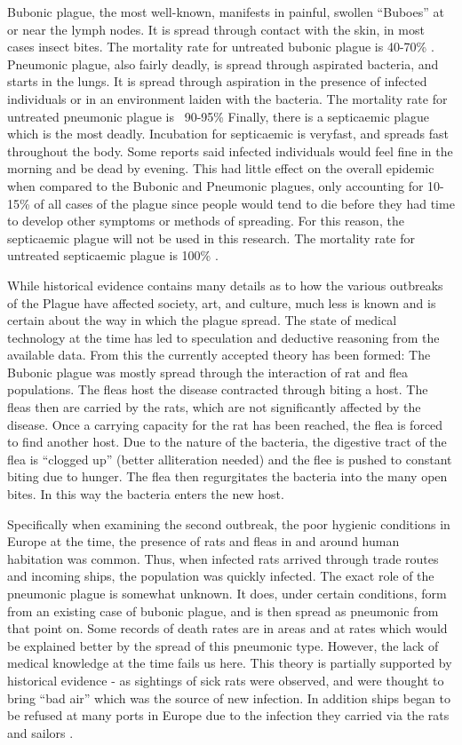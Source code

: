 \documentclass [letterpaper, 12pt] {article}
\begin{document}
Bubonic plague, the most well-known, manifests in painful, swollen “Buboes” at or near the lymph nodes. It is spread through contact with the skin, in most cases insect bites. The mortality rate for untreated bubonic plague is 40-70\% \cite{ditchburn_hodgkins_2019} . Pneumonic plague, also fairly deadly, is spread through aspirated bacteria, and starts in the lungs. It is spread through aspiration in the presence of infected individuals or in an environment laiden with the bacteria. The mortality rate for untreated pneumonic plague is ~90-95\% Finally, there is a septicaemic plague which is the most deadly. Incubation for septicaemic is veryfast, and spreads fast throughout the body. Some reports said infected individuals would feel fine in the morning and be dead by evening. This had little effect on the overall epidemic when compared to the Bubonic and Pneumonic plagues, only accounting for 10-15\% of all cases of the plague since people would tend to die before they had time to develop other symptoms or methods of spreading. For this reason, the septicaemic plague will not be used in this research. The mortality rate for untreated septicaemic plague is 100\% \cite{ditchburn_hodgkins_2019}.

While historical evidence contains many details as to how the various outbreaks of the Plague have affected society, art, and culture, much less is known and is certain about the way in which the plague spread. The state of medical technology at the time has led to speculation and deductive reasoning from the available data. From this the currently accepted theory has been formed: The Bubonic plague was mostly spread through the interaction of rat and flea populations. The fleas host the disease contracted through biting a host. The fleas then are carried by the rats, which are not significantly affected by the disease. Once a carrying capacity for the rat has been reached, the flea is forced to find another host. Due to the nature of the bacteria, the digestive tract of the flea is “clogged up” (better alliteration needed) and the flee is pushed to constant biting due to hunger. The flea then regurgitates the bacteria into the many open bites. In this way the bacteria enters the new host.

Specifically when examining the second outbreak, the poor hygienic conditions in Europe at the time, the presence of rats and fleas in and around human habitation was common. Thus, when infected rats arrived through trade routes and incoming ships, the population was quickly infected.
The exact role of the pneumonic plague is somewhat unknown. It does, under certain conditions, form from an existing case of bubonic plague, and is then spread as pneumonic from that point on. Some records of death rates are in areas and at rates which would be explained better by the spread of this pneumonic type. However, the lack of medical knowledge at the time fails us here.
This theory is partially supported by historical evidence - as sightings of sick rats were observed, and were thought to bring “bad air” which was the source of new infection. In addition ships began to be refused at many ports in Europe due to the infection they carried via the rats and sailors \cite{barbara_et_al_2016}.
\end{document}
